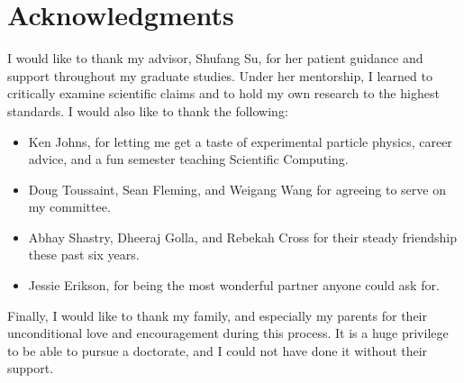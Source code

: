 \chapter*{Acknowledgments}

I would like to thank my advisor, Shufang Su, for her patient guidance and support throughout my graduate studies. Under her mentorship, I learned to critically examine scientific claims and to hold my own research to the highest standards. 
I would also like to thank the following:
\begin{itemize}
\item Ken Johns, for letting me get a taste of experimental particle physics, career advice, and a fun semester teaching Scientific Computing.
\item Doug Toussaint, Sean Fleming, and Weigang Wang for agreeing to serve on my committee.
\item Abhay Shastry, Dheeraj Golla, and Rebekah Cross for their steady friendship these past six years.
\item Jessie Erikson, for being the most wonderful partner anyone could ask for.
\end{itemize}
Finally, I would like to thank my family, and especially my parents for their unconditional love and encouragement during this process. It is a huge privilege to be able to pursue a doctorate, and I could not have done it without their support.
